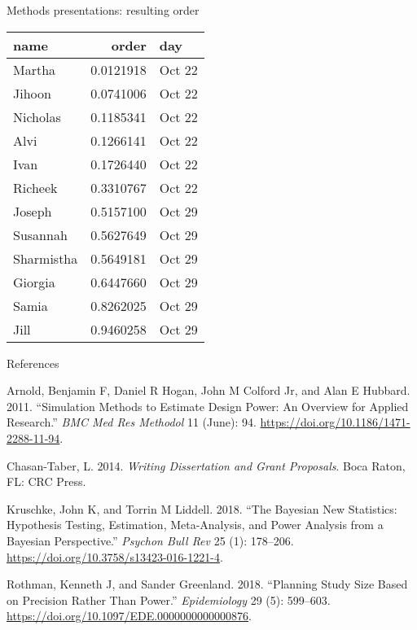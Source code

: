\documentclass[ignorenonframetext,]{beamer}
\begin{document}
\begin{frame}{Methods presentations: resulting order}
\protect\hypertarget{methods-presentations-resulting-order}{}

\begin{tabular}{lrl}
\toprule
name & order & day\\
\midrule
Martha & 0.0121918 & Oct 22\\
Jihoon & 0.0741006 & Oct 22\\
Nicholas & 0.1185341 & Oct 22\\
Alvi & 0.1266141 & Oct 22\\
Ivan & 0.1726440 & Oct 22\\
\addlinespace
Richeek & 0.3310767 & Oct 22\\
Joseph & 0.5157100 & Oct 29\\
Susannah & 0.5627649 & Oct 29\\
Sharmistha & 0.5649181 & Oct 29\\
Giorgia & 0.6447660 & Oct 29\\
\addlinespace
Samia & 0.8262025 & Oct 29\\
Jill & 0.9460258 & Oct 29\\
\bottomrule
\end{tabular}

\end{frame}

\begin{frame}{References}
\protect\hypertarget{references}{}

\hypertarget{refs}{}
\leavevmode\hypertarget{ref-Arnold:2011qf}{}%
Arnold, Benjamin F, Daniel R Hogan, John M Colford Jr, and Alan E
Hubbard. 2011. ``Simulation Methods to Estimate Design Power: An
Overview for Applied Research.'' \emph{BMC Med Res Methodol} 11 (June):
94. \url{https://doi.org/10.1186/1471-2288-11-94}.

\leavevmode\hypertarget{ref-Chasan-Taber:2014tw}{}%
Chasan-Taber, L. 2014. \emph{Writing Dissertation and Grant Proposals}.
Boca Raton, FL: CRC Press.

\leavevmode\hypertarget{ref-Kruschke:2018ak}{}%
Kruschke, John K, and Torrin M Liddell. 2018. ``The Bayesian New
Statistics: Hypothesis Testing, Estimation, Meta-Analysis, and Power
Analysis from a Bayesian Perspective.'' \emph{Psychon Bull Rev} 25 (1):
178--206. \url{https://doi.org/10.3758/s13423-016-1221-4}.

\leavevmode\hypertarget{ref-Rothman:2018sf}{}%
Rothman, Kenneth J, and Sander Greenland. 2018. ``Planning Study Size
Based on Precision Rather Than Power.'' \emph{Epidemiology} 29 (5):
599--603. \url{https://doi.org/10.1097/EDE.0000000000000876}.

\end{frame}
\end{document}

